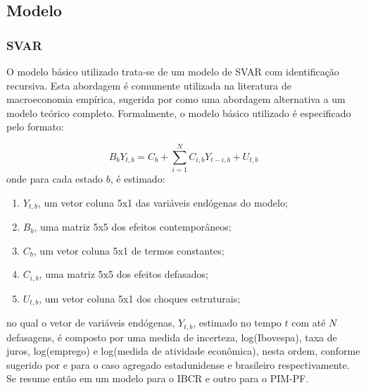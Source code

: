 
\subsection{Modelo}
\subsubsection{SVAR}
O modelo básico utilizado trata-se de um modelo de \gls{SVAR} com identificação recursiva. Esta abordagem é comumente utilizada na literatura de macroeconomia empírica, sugerida por  como uma abordagem alternativa a um modelo teórico completo. Formalmente, o modelo básico utilizado é especificado pelo formato:

\begin{equation}
\label{eq:model_1}
    B_{b}Y_{t,b}=C_{b}+\sum_{i=1}^{N} {C_{i,b}Y_{t-i,b}} + U_{t,b}
\end{equation}
onde para cada estado $b$, é estimado:
\begin{enumerate}
    \item[] $Y_{t,b}$, um vetor coluna 5x1 das variáveis endógenas do modelo;
    \item[] $B_{b}$, uma matriz 5x5 dos efeitos contemporâneos;
    \item[] $C_b$, um vetor coluna 5x1 de termos constantes;
    \item[] $C_{i,b}$, uma matriz 5x5 dos efeitos defasados;
    \item[] $U_{t,b}$, um vetor coluna 5x1 dos choques estruturais;
\end{enumerate}
no qual o vetor de variáveis endógenas, $Y_{t,b}$, estimado no tempo $t$ com até $N$ defasagens, é composto por uma medida de incerteza, log(Ibovespa), taxa de juros, log(emprego) e log(medida de atividade econômica), nesta ordem, conforme sugerido por  e  para o caso agregado estadunidense e brasileiro respectivamente. Se resume então em um modelo para o \gls{IBCR} e outro para o \gls{PIM-PF}.
\par

